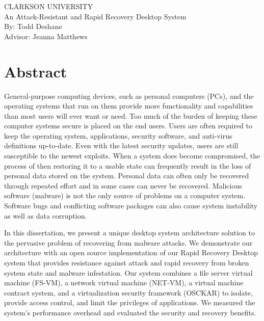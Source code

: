 

  \begin{center}
    \vspace*{10mm}
    CLARKSON UNIVERSITY\\
    \vspace{1mm}
    \normalsize{An Attack-Resistant and Rapid Recovery Desktop System}\\
    \vspace{1mm}
    \normalsize{By: Todd Deshane}\\
    \vspace{1mm}
    \normalsize{Advisor: Jeanna Matthews}\\
  \end{center}



\section*{Abstract}



General-purpose computing devices, such as personal computers (PCs), and the operating systems that run on them provide more functionality and capabilities than most users will ever want or need. Too much of the burden of keeping these computer systems secure is placed on the end users. Users are often required to keep the operating system, applications, security software, and anti-virus definitions up-to-date. Even with the latest security updates, users are still susceptible to the newest exploits. When a system does become compromised, the process of then restoring it to a usable state can frequently result in the loss of personal data stored on the system. Personal data can often only be recovered through repeated effort and in some cases can never be recovered. Malicious software (malware) is not the only source of problems on a computer system. Software bugs and conflicting software packages can also cause system instability as well as data corruption.

In this dissertation, we present a unique desktop system architecture solution to the pervasive problem of recovering from malware attacks. We demonstrate our architecture with an open source implementation of our Rapid Recovery Desktop system that provides resistance against attack and rapid recovery from broken system state and malware infestation. Our system combines a file server virtual machine (FS-VM), a network virtual machine (NET-VM), a virtual machine contract system, and a virtualization security framework (OSCKAR) to isolate, provide access control, and limit the privileges of applications. We measured the system's performance overhead and evaluated the security and recovery benefits.


